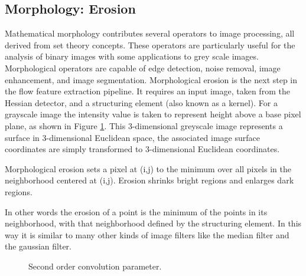 \subsection{Morphology: Erosion}
Mathematical morphology contributes several operators to image processing, all derived from set theory concepts. These operators are particularly useful for the analysis of binary images with some applications to grey scale images. Morphological operators are capable of edge detection, noise removal, image enhancement, and image segmentation. Morphological erosion is the next step in the flow feature extraction pipeline. It requires an input image, taken from the Hessian detector, and a structuring element (also known as a kernel). For a grayscale image the intensity value is taken to represent height above a base pixel plane, as shown in Figure \ref{fig:erosion}. This 3-dimensional greyscale image represents a surface in 3-dimensional Euclidean space, the associated image surface coordinates are simply transformed to 3-dimensional Euclidean coordinates.

Morphological erosion sets a pixel at (i,j) to the minimum over all pixels in the neighborhood centered at (i,j). Erosion shrinks bright regions and enlarges dark regions.

In other words the erosion of a point is the minimum of the points in its neighborhood, with that neighborhood defined by the structuring element. In this way it is similar to many other kinds of image filters like the median filter and the gaussian filter.

\begin{figure}[H]
  \centering
  \hfill
  \caption{Second order convolution parameter.}
  \label{fig:erosion}
\end{figure}



